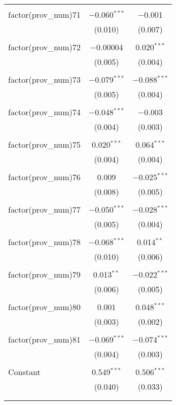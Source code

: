 \begin{table}[!htbp]
\begin{tabular}{@{\extracolsep{5pt}}lcc}
  & & \\ 
 factor(prov\_num)71 & $-$0.060$^{***}$ & $-$0.001 \\ 
  & (0.010) & (0.007) \\ 
  & & \\ 
 factor(prov\_num)72 & $-$0.00004 & 0.020$^{***}$ \\ 
  & (0.005) & (0.004) \\ 
  & & \\ 
 factor(prov\_num)73 & $-$0.079$^{***}$ & $-$0.088$^{***}$ \\ 
  & (0.005) & (0.004) \\ 
  & & \\ 
 factor(prov\_num)74 & $-$0.048$^{***}$ & $-$0.003 \\ 
  & (0.004) & (0.003) \\ 
  & & \\ 
 factor(prov\_num)75 & 0.020$^{***}$ & 0.064$^{***}$ \\ 
  & (0.004) & (0.004) \\ 
  & & \\ 
 factor(prov\_num)76 & 0.009 & $-$0.025$^{***}$ \\ 
  & (0.008) & (0.005) \\ 
  & & \\ 
 factor(prov\_num)77 & $-$0.050$^{***}$ & $-$0.028$^{***}$ \\ 
  & (0.005) & (0.004) \\ 
  & & \\ 
 factor(prov\_num)78 & $-$0.068$^{***}$ & 0.014$^{**}$ \\ 
  & (0.010) & (0.006) \\ 
  & & \\ 
 factor(prov\_num)79 & 0.013$^{**}$ & $-$0.022$^{***}$ \\ 
  & (0.006) & (0.005) \\ 
  & & \\ 
 factor(prov\_num)80 & 0.001 & 0.048$^{***}$ \\ 
  & (0.003) & (0.002) \\ 
  & & \\ 
 factor(prov\_num)81 & $-$0.069$^{***}$ & $-$0.074$^{***}$ \\ 
  & (0.004) & (0.003) \\ 
  & & \\ 
 Constant & 0.549$^{***}$ & 0.506$^{***}$ \\ 
  & (0.040) & (0.033) \\ 
  & & \\ 
\hline \\[-1.8ex] 

\end{tabular}
\end{table}
